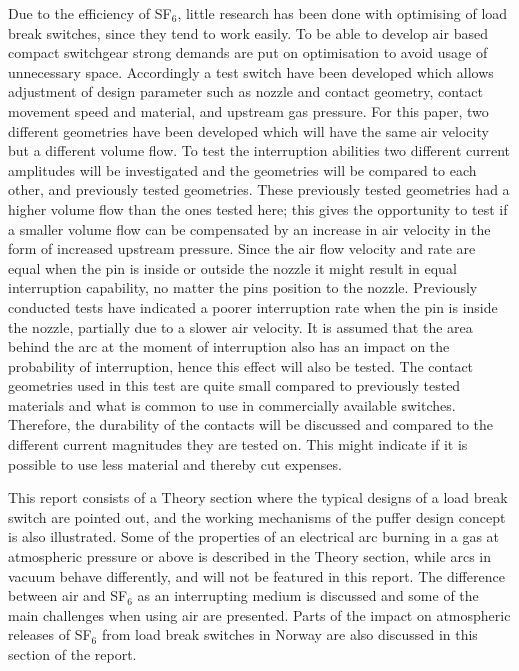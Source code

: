 \documentclass[10pt,a4paper,twoside]{article}
\begin{document}
Due to the efficiency of SF$_6$, little research has been done with optimising of load break switches, since they tend to work easily. To be able to develop air based compact switchgear strong demands are put on optimisation to avoid usage of unnecessary space. Accordingly a test switch have been developed which allows adjustment of design parameter such as nozzle and contact geometry, contact movement speed and material, and upstream gas pressure. For this paper, two different geometries have been developed which will have the same air velocity but a different volume flow. To test the interruption abilities two different current amplitudes will be investigated and the geometries will be compared to each other, and previously tested geometries. These previously tested geometries had a higher volume flow than the ones tested here; this gives the opportunity to test if a smaller volume flow can be compensated by an increase in air velocity in the form of increased upstream pressure. Since the air flow velocity and rate are equal when the pin is inside or outside the nozzle it might result in equal interruption capability, no matter the pins position to the nozzle. Previously conducted tests have indicated a poorer interruption rate when the pin is inside the nozzle, partially due to a slower air velocity. It is assumed that the area behind the arc at the moment of interruption also has an impact on the probability of interruption, hence this effect will also be tested. The contact geometries used in this test are quite small compared to previously tested materials and what is common to use in commercially available switches. Therefore, the durability of the contacts will be discussed and compared to the different current magnitudes they are tested on. This might indicate if it is possible to use less material and thereby cut expenses.

This report consists of a Theory section where the typical designs of a load break switch are pointed out, and the working mechanisms of the puffer design concept is also illustrated. Some of the properties of an electrical arc burning in a gas at atmospheric pressure or above is described in the Theory section, while arcs in vacuum behave differently, and will not be featured in this report. The difference between air and SF$_6$ as an interrupting medium is discussed and some of the main challenges when using air are presented. Parts of the impact on atmospheric releases of SF$_6$ from load break switches in Norway are also discussed in this section of the report.
\end{document}
